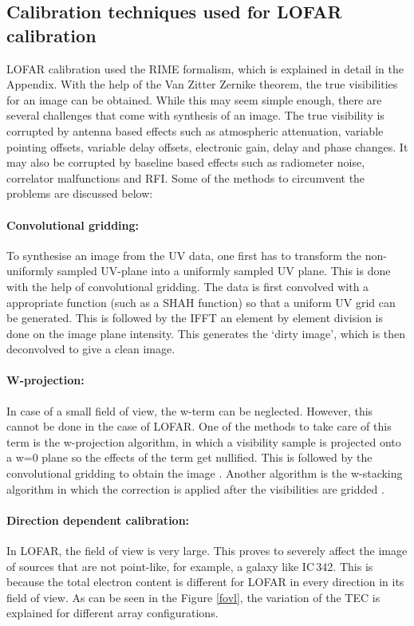 \documentclass[../main/thesis_msc.tex]{subfiles}
\begin{document}
\subsection{Calibration techniques used for LOFAR calibration}
LOFAR calibration used the RIME formalism, which is explained in detail in the Appendix. With the help of the Van Zitter Zernike theorem, the true visibilities for an image can be obtained. While this may seem simple enough, there are several challenges that come with synthesis of an image. The true visibility is corrupted by antenna based effects such as atmospheric attenuation, variable pointing offsets, variable delay offsets, electronic gain, delay and phase changes. It may also be corrupted by baseline based effects such as radiometer noise, correlator malfunctions and RFI. Some of the methods to circumvent the problems are discussed below:
\paragraph{Convolutional gridding:}
To synthesise an image from the UV data, one first has to transform the non-uniformly sampled UV-plane into a uniformly sampled UV plane. This is done with the help of convolutional gridding. The data is first convolved with a appropriate function (such as a SHAH function) so that a uniform UV grid can be generated. This is followed by the IFFT an element by element division is done on the image plane intensity. This generates the `dirty image', which is then deconvolved to give a clean image. 
\paragraph{W-projection:}
In case of a small field of view, the w-term can be neglected. However, this cannot be done in the case of LOFAR. One of the methods to take care of this term is the w-projection algorithm, in which a visibility sample is projected onto a w=0 plane so the effects of the term get nullified. This is followed by the convolutional gridding to obtain the image \citep{2008ISTSP...2..647C}. Another algorithm is the w-stacking algorithm in which the correction is applied after the visibilities are gridded \citep{2012SPIE.8500E..0LC}.
\paragraph{Direction dependent calibration:} 
In LOFAR, the field of view is very large. This proves to severely affect the image of sources that are not point-like, for example, a galaxy like IC\,342. This is because the total electron content is different for LOFAR in every direction in its field of view. As can be seen in the Figure \ref{fovl}, the variation of the TEC is explained for different array configurations.
\end{document}
